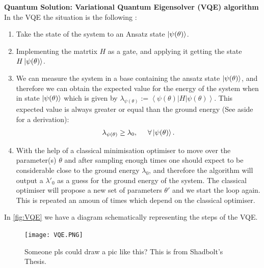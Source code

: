 \begin{tcolorbox}[standard jigsaw,
    opacityback=0,  %
    boxrule=0.5pt,label={VQEbox}]
    {\bf Quantum Solution: Variational Quantum Eigensolver (VQE) algorithm}
    \tcbline
    In the VQE the situation is the following \cite{ES1,ES2,ES3,ES4,ES5,ES6,ES7}:
    \begin{enumerate}
    \item Take the state of the system to an Ansatz state $\left\vert{\psi(\theta)}\right\rangle$.
    \item Implementing the matrtix $H$ as a gate, and applying it getting the state $H\left\vert{\psi(\theta)}\right\rangle$.
    \item We can measure the system in a base containing the ansatz state $\left\vert{\psi(\theta)}\right\rangle$, and therefore we can obtain the expected value for the energy of the system when in state $\left\vert{\psi(\theta)}\right\rangle$ which is given by  $\lambda_{\psi(\theta)}:=\left< \psi(\theta)|H| \psi(\theta)\right>$. This expected value is always greater or equal than the ground energy (See aside for a derivation):
        \begin{align}
        \lambda_{\psi(\theta)} \geq \lambda_0, \hspace{0.5cm}\forall \left\vert{\psi(\theta)}\right\rangle.
        \label{eq:inequality}
        \end{align}
    \item With the help of a classical minimisation optimiser to move over the parameter(s) $\theta$ and after sampling enough times one should expect to be considerable close to the ground energy $\lambda_0$, and therefore the algorithm will output a $\lambda'_0$ as a guess for the ground energy of the system. The classical optimiser will propose a new set of parameters $\theta'$ and we start the loop again. This is repeated an amoun of times which depend on the classical optimiser.
    \end{enumerate}
\end{tcolorbox}
 
In \autoref{fig:VQE} we have a diagram schematically representing the steps of the VQE.

\begin{figure}[h!]
    \centering
    \texttt{[image: VQE.PNG]}
    \caption{Someone pls could draw a pic like this? This is from Shadbolt's Thesis.}
    \label{fig:VQE}
\end{figure}

